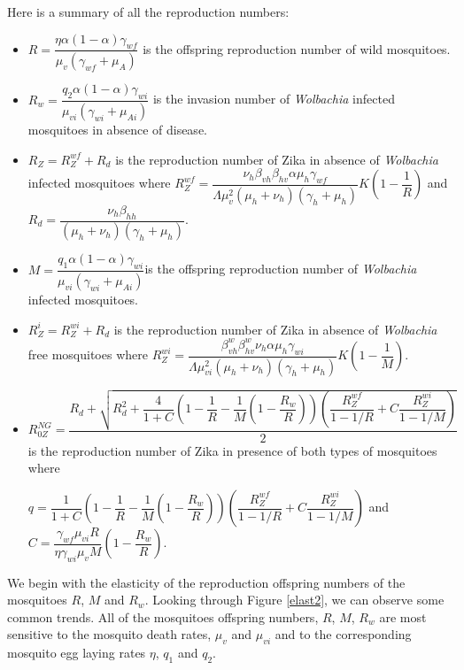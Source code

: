 \documentclass{ws-rv9x6}
\begin{document}
Here is a summary of all the reproduction numbers: 
\begin{itemize}
    \item $R=\dfrac{\eta \alpha (1-\alpha)\gamma_{wf}}{\mu_v (\gamma_{wf}+\mu_A)}$ is the offspring reproduction number of wild mosquitoes.
    \item $R_w=\dfrac{q_2\alpha(1-\alpha)\gamma_{wi}}{\mu_{vi}(\gamma_{wi}+\mu_{Ai})}$ is the invasion number of \textit{Wolbachia} infected mosquitoes in absence of disease.
    \item $R_Z=R^{wf}_Z+R_d$ is the reproduction number of Zika in absence of \textit{Wolbachia} infected mosquitoes where $R^{wf}_Z=\dfrac{\nu_h\beta_{vh}\beta_{hv}\alpha\mu_h\gamma_{wf}}{\Lambda\mu^2_v(\mu_h+\nu_h)(\gamma_h+\mu_h)}K\left(1-\dfrac{1}{R}\right)$ and $R_d=\dfrac{\nu_h\beta_{hh}}{(\mu_h+\nu_h)(\gamma_h+\mu_h)}$.
    \item $M=\dfrac{q_1 \alpha (1-\alpha)\gamma_{wi}}{\mu_{vi} (\gamma_{wi}+\mu_{Ai})}$is the offspring reproduction number of \textit{Wolbachia} infected mosquitoes.
    \item $R^i_Z=R^{wi}_Z+R_d$ is the reproduction number of Zika in absence of \textit{Wolbachia} free mosquitoes where  $R^{wi}_Z=\dfrac{\beta^w_{vh}\beta^w_{hv}\nu_h\alpha \mu_h\gamma_{wi}}{\Lambda \mu^2_{vi}(\mu_h+\nu_h)(\gamma_h+\mu_h)}K\left(1-\dfrac{1}{M}\right).$
    \item $R_{0Z}^{NG}=\dfrac{R_d+\sqrt{R_d^2+\dfrac{4}{1+C}\left( 1-\dfrac{1}{R}-\dfrac{1}{M}\left(1-\dfrac{R_w}{R}\right)\right)\left(\dfrac{R^{wf}_Z}{1-1/R}+C\dfrac{R^{wi}_Z}{1-1/M}\right)}}{2}$ is the reproduction number of Zika in presence of both types of mosquitoes where 
    
    $q=\dfrac{1}{1+C}\left( 1-\dfrac{1}{R}-\dfrac{1}{M}\left(1-\dfrac{R_w}{R}\right)\right)\left(\dfrac{R^{wf}_Z}{1-1/R}+C\dfrac{R^{wi}_Z}{1-1/M}\right)$ and $C=\dfrac{\gamma_{wf}\mu_{vi}R}{\eta\gamma_{wi}\mu_vM}\left(1-\dfrac{R_w}{R}\right).$
 \end{itemize}   
    \vspace{0.2in}
    We begin with the elasticity of the reproduction offspring numbers of the mosquitoes $R$, $M$ and $R_w$. Looking through Figure \ref{elast2}, we can observe some common trends. All of the mosquitoes offspring numbers, $R$, $M$, $R_w$ are most sensitive to the mosquito death rates, $\mu_v$ and $\mu_{vi}$ and to the corresponding mosquito egg laying rates $\eta$, $q_1$ and $q_2$.
    
\end{document}
